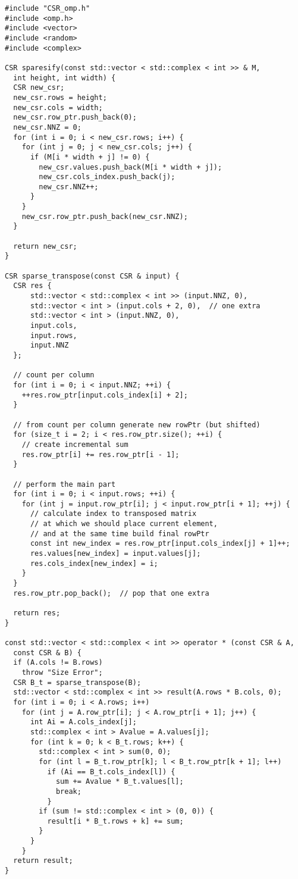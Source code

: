 \documentclass{report}
\begin{document}
\begin{lstlisting}
#include "CSR_omp.h"
#include <omp.h>
#include <vector>
#include <random>
#include <complex>

CSR sparesify(const std::vector < std::complex < int >> & M,
  int height, int width) {
  CSR new_csr;
  new_csr.rows = height;
  new_csr.cols = width;
  new_csr.row_ptr.push_back(0);
  new_csr.NNZ = 0;
  for (int i = 0; i < new_csr.rows; i++) {
    for (int j = 0; j < new_csr.cols; j++) {
      if (M[i * width + j] != 0) {
        new_csr.values.push_back(M[i * width + j]);
        new_csr.cols_index.push_back(j);
        new_csr.NNZ++;
      }
    }
    new_csr.row_ptr.push_back(new_csr.NNZ);
  }

  return new_csr;
}

CSR sparse_transpose(const CSR & input) {
  CSR res {
      std::vector < std::complex < int >> (input.NNZ, 0),
      std::vector < int > (input.cols + 2, 0),  // one extra
      std::vector < int > (input.NNZ, 0),
      input.cols,
      input.rows,
      input.NNZ
  };

  // count per column
  for (int i = 0; i < input.NNZ; ++i) {
    ++res.row_ptr[input.cols_index[i] + 2];
  }

  // from count per column generate new rowPtr (but shifted)
  for (size_t i = 2; i < res.row_ptr.size(); ++i) {
    // create incremental sum
    res.row_ptr[i] += res.row_ptr[i - 1];
  }

  // perform the main part
  for (int i = 0; i < input.rows; ++i) {
    for (int j = input.row_ptr[i]; j < input.row_ptr[i + 1]; ++j) {
      // calculate index to transposed matrix
      // at which we should place current element,
      // and at the same time build final rowPtr
      const int new_index = res.row_ptr[input.cols_index[j] + 1]++;
      res.values[new_index] = input.values[j];
      res.cols_index[new_index] = i;
    }
  }
  res.row_ptr.pop_back();  // pop that one extra

  return res;
}

const std::vector < std::complex < int >> operator * (const CSR & A,
  const CSR & B) {
  if (A.cols != B.rows)
    throw "Size Error";
  CSR B_t = sparse_transpose(B);
  std::vector < std::complex < int >> result(A.rows * B.cols, 0);
  for (int i = 0; i < A.rows; i++)
    for (int j = A.row_ptr[i]; j < A.row_ptr[i + 1]; j++) {
      int Ai = A.cols_index[j];
      std::complex < int > Avalue = A.values[j];
      for (int k = 0; k < B_t.rows; k++) {
        std::complex < int > sum(0, 0);
        for (int l = B_t.row_ptr[k]; l < B_t.row_ptr[k + 1]; l++)
          if (Ai == B_t.cols_index[l]) {
            sum += Avalue * B_t.values[l];
            break;
          }
        if (sum != std::complex < int > (0, 0)) {
          result[i * B_t.rows + k] += sum;
        }
      }
    }
  return result;
}


\end{lstlisting}
\end{document}
